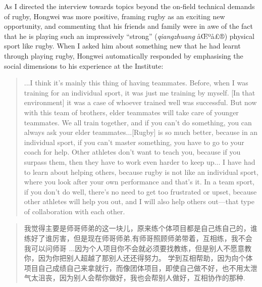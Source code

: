 \begin{CJK}{UTF8}{gbsn}
As I directed the interview towards topics beyond the on-field technical demands of rugby, Hongwei was more positive, framing rugby as an exciting new opportunity, and commenting that his friends and family were in awe of the fact that he is playing such an impressively ``strong'' (\textit{qiangzhuang} åŒºå£®) physical sport like rugby.  When I asked him about something new that he had learnt through playing rugby, Hongwei automatically responded by emphasising the social dimensions to his experience at the Institute:

  \begin{quote}
    ...I think it's mainly this thing of having teammates. Before, when I was training for an individual sport, it was just me training by myself. [In that environment] it was a case of whoever trained well was successful.  But now with this team of brothers, elder teammates will take care of younger teammates. We all train together, and if you can't do something, you can always ask your elder teammates...[Rugby] is so much better, because in an individual sport, if you can't master something, you have to go to your coach for help. Other athletes don't want to teach you, because if you surpass them, then they have to work even harder to keep up... I have had to learn about helping others, because rugby is not like an individual sport, where you look after your own performance and that's it.  In a team sport, if you don't do well, there's no need to get too frustrated or upset, because other athletes will help you out, and I will also help others out---that type of collaboration with each other.
  \end{quote}

\begin{CJK}{UTF8}{gbsn}
  \begin{quote}
    我觉得主要是师哥师弟的这一块儿，原来练个体项目都是自己练自己的，谁练好了谁厉害，但是现在师哥师弟,有师哥照顾师弟带着，互相练，我不会我可以问师哥
    ...因为个人项目你不会就必须要找教练，但是别人不愿意教你，因为你把别人超越了那别人还还得努力。 学到互相帮助，因为向个体项目自己成绩自己来拿就行，而像团体项目，即使自己做不好，也不用太泄气太沮丧，因为别人会帮你做好，我也会帮别人做好，互相协作的那种.
  \end{quote}
\end{CJK}


\end{CJK}
